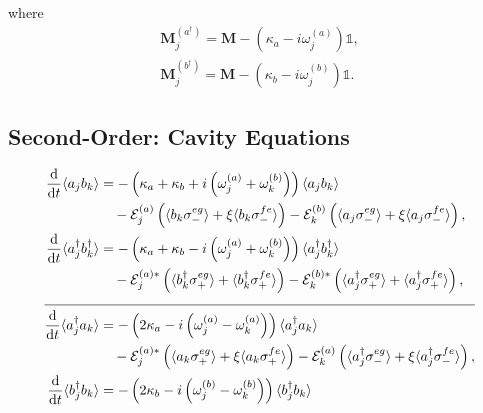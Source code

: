 \documentclass{article}
\newcommand{\ddt}[1][]{\frac{\mathrm{d} #1}{\mathrm{d}t}}
\begin{document}
where
\begin{subequations}
	\begin{gather}
		\bm{M}^{(a^{\dagger})}_{j} = \bm{M} - \left( \kappa_{a} - i \omega_{j}^{(a)} \right) \mathbb{1}, \\
		\bm{M}^{(b^{\dagger})}_{j} = \bm{M} - \left( \kappa_{b} - i \omega_{j}^{(b)} \right) \mathbb{1}.
	\end{gather}
\end{subequations}

\subsection{Second-Order: Cavity Equations}

\begin{subequations}
	\begin{align}
		\ddt \langle a_{j} b_{k} \rangle &= -\left( \kappa_{a} + \kappa_{b} + i \left( \omega_{j}^{(a)} + \omega_{k}^{(b)} \right) \right) \langle a_{j} b_{k} \rangle \nonumber \\
		&\quad - \mathcal{E}_{j}^{(a)} \left( \langle b_{k} \sigma^{eg}_{-} \rangle + \xi \langle b_{k} \sigma^{fe}_{-} \rangle \right) - \mathcal{E}_{k}^{(b)} \left( \langle a_{j} \sigma^{eg}_{-} \rangle + \xi \langle a_{j} \sigma^{fe}_{-} \rangle \right), \\
		\ddt \langle a^{\dagger}_{j} b^{\dagger}_{k} \rangle &= -\left( \kappa_{a} + \kappa_{b} - i \left( \omega_{j}^{(a)} + \omega_{k}^{(b)} \right) \right) \langle a^{\dagger}_{j} b^{\dagger}_{k} \rangle \nonumber \\
		&\quad  - \mathcal{E}_{j}^{(a) *} \left( \langle b^{\dagger}_{k} \sigma^{eg}_{+} \rangle + \langle b^{\dagger}_{k} \sigma^{fe}_{+} \rangle \right) - \mathcal{E}_{k}^{(b) *} \left( \langle a^{\dagger}_{j} \sigma^{eg}_{+} \rangle + \langle a^{\dagger}_{j} \sigma^{fe}_{+} \rangle \right), \\
		\cline{1-2}
		\ddt \langle a^{\dagger}_{j} a_{k} \rangle &= -\left( 2 \kappa_{a} - i \left( \omega_{j}^{(a)}- \omega_{k}^{(a)} \right) \right) \langle a^{\dagger}_{j} a_{k} \rangle \nonumber \\
		&\quad - \mathcal{E}_{j}^{(a) *} \left( \langle a_{k} \sigma^{eg}_{+} \rangle + \xi \langle a_{k} \sigma^{fe}_{+} \rangle \right)- \mathcal{E}_{k}^{(a)} \left( \langle a_{j}^{\dagger} \sigma^{eg}_{-} \rangle + \xi \langle a_{j}^{\dagger} \sigma^{fe}_{-} \rangle \right), \\
		\ddt \langle b^{\dagger}_{j} b_{k} \rangle &= -\left( 2 \kappa_{b} - i \left( \omega_{j}^{(b)}- \omega_{k}^{(b)} \right) \right) \langle b^{\dagger}_{j} b_{k} \rangle \nonumber \\

\end{align}
\end{subequations}
\end{document}
